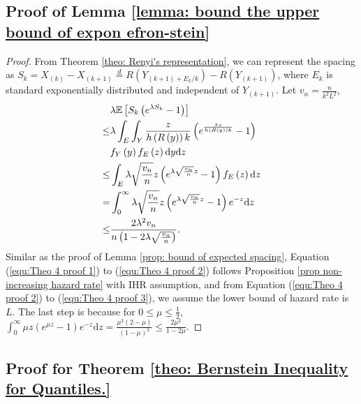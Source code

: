 \subsection{Proof of Lemma \ref{lemma: bound the upper bound of expon efron-stein}}
\BoundUpperExpEfronStein*
\begin{proof}
From Theorem \ref{theo: Renyi's representation}, we can represent the spacing as $S_{k}=X_{\left(k\right)}-X_{\left(k + 1\right)} \stackrel{d}{=} R\left(Y_{\left(k+1\right) + E_{k} /k} \right)-R\left(Y_{\left(k+1\right)}\right)$, where $E_{k}$ is standard exponentially distributed and independent of $Y_{\left(k + 1\right)}$. Let $v_n = \frac{n}{k^2 L^2}$,
\begin{align}
    \label{equ:Theo 4 proof 1}
    & \lambda\mathbb{E}\left[S_{k}\left(e^{\lambda S_{k}}-1\right)\right] \\
    \label{equ:Theo 4 proof 2}
    \leq & \lambda  \int_{E} \int_{Y} \frac{z}{h\left(R\left(y\right)\right)k} \left(e^{ \frac{\lambda z}{h\left(R\left(y\right)\right)k}} - 1\right) \nonumber\\
    & f_Y\left(y\right) f_E\left(z\right) \mathrm{d} y \mathrm{d} z\\
    \label{equ:Theo 4 proof 3}
    \leq &  \int_E \lambda  \sqrt{\frac{v_{n}}{n}} z \left(e^{\lambda \sqrt{\frac{v_{n}}{n}}z} -1\right) f_E\left(z\right) \mathrm{d} z \\
    \label{equ:Theo 4 proof 4}
    =  & \int_0^\infty \lambda  \sqrt{\frac{v_{n}}{n}} z \left(e^{\lambda \sqrt{\frac{v_{n}}{n}} z } -1\right) e^{-z} \mathrm{d} z\\
    \label{equ:Theo 4 proof 5}
    \leq &  \frac{2\lambda^2 v_n}{n \left(1 - 2 \lambda \sqrt{\frac{v_n}{n}}\right)}.
\end{align}
Similar as the proof of Lemma \ref{prop: bound of expected spacing}, Equation (\ref{equ:Theo 4 proof 1}) to (\ref{equ:Theo 4 proof 2}) follows Proposition \ref{prop non-increasing hazard rate} with IHR assumption, and from Equation (\ref{equ:Theo 4 proof 2}) to (\ref{equ:Theo 4 proof 3}), we assume the lower bound of hazard rate is $L$. The last step is because for $0 \leq \mu \leq \frac{1}{2}$, $\int_{0}^{\infty} \mu z\left(e^{\mu z}-1\right) e^{-z} \mathrm{d} z=\frac{\mu^{2}\left(2-\mu\right)}{\left(1-\mu\right)^{2}} \leq \frac{2 \mu^{2}}{1-2 \mu}$.
\end{proof}{}

\subsection{Proof for Theorem \ref{theo: Bernstein Inequality for Quantiles.}}
\label{app-sec: proof for theo: Bernstein Inequality for Quantiles.}


